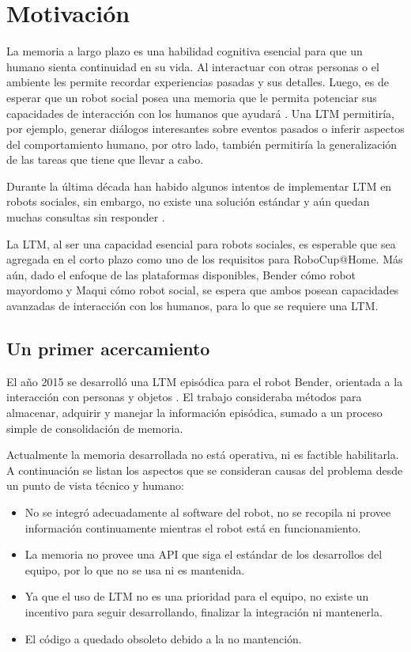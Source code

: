 \section{Motivación}

La memoria a largo plazo es una habilidad cognitiva esencial para que un humano sienta continuidad en su vida. Al interactuar con otras personas o el ambiente les permite recordar experiencias pasadas y sus detalles. Luego, es de esperar que un robot social posea una memoria que le permita potenciar sus capacidades de interacción con los humanos que ayudará \cite{Vijayakumar2014}. Una LTM permitiría, por ejemplo, generar diálogos interesantes sobre eventos pasados o inferir aspectos del comportamiento humano, por otro lado, también permitiría la generalización de las tareas que tiene que llevar a cabo.

Durante la última década han habido algunos intentos de implementar LTM en robots sociales, sin embargo, no existe una solución estándar y aún quedan muchas consultas sin responder \cite{ltm_in_robocup}.

La LTM, al ser una capacidad esencial para robots sociales, es esperable que sea agregada en el corto plazo como uno de los requisitos para RoboCup@Home. Más aún, dado el enfoque de las plataformas disponibles, Bender cómo robot mayordomo y Maqui cómo robot social, se espera que ambos posean capacidades avanzadas de interacción con los humanos, para lo que se requiere una LTM.


\subsection{Un primer acercamiento}

El año 2015 se desarrolló una LTM episódica para el robot Bender, orientada a la interacción con personas y objetos \cite{Sanchez:2015}. El trabajo consideraba métodos para almacenar, adquirir y manejar la información episódica, sumado a un proceso simple de consolidación de memoria.

Actualmente la memoria desarrollada no está operativa, ni es factible habilitarla. A continuación se listan los aspectos que se consideran causas del problema desde un punto de vista técnico y humano:
\begin{itemize}
	\item No se integró adecuadamente al software del robot, no se recopila ni provee información continuamente mientras el robot está en funcionamiento.
	\item La memoria no provee una API que siga el estándar de los desarrollos del equipo, por lo que no se usa ni es mantenida.
	\item Ya que el uso de LTM no es una prioridad para el equipo, no existe un incentivo para seguir desarrollando, finalizar la integración ni mantenerla. 
	\item El código a quedado obsoleto debido a la no mantención.
\end{itemize}

